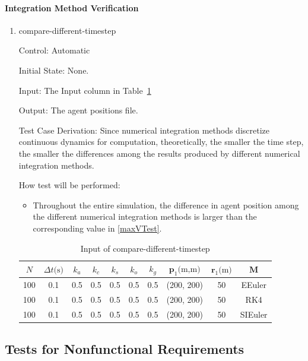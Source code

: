\documentclass[12pt, titlepage]{article}
\begin{document}
\paragraph{Integration Method Verification}

\begin{enumerate}

\item{compare-different-timestep\\} \label{timestepVTest}

Control: Automatic
					
Initial State: None.
					
Input: The Input column in Table~\ref{TblMethodTest1}
					
Output: The agent positions file.

Test Case Derivation: Since numerical integration methods discretize 
continuous dynamics for computation, theoretically, the smaller the time step, 
the smaller the differences among the results produced by different numerical 
integration methods.

How test will be performed: 
\begin{itemize}
\item Throughout the entire simulation, the difference in agent position among 
the different numerical integration methods is larger than the corresponding 
value in \ref{maxVTest}.
\end{itemize}

\begin{longtable}{c c c c c c c c c c}
\caption{Input of compare-different-timestep} \label{TblMethodTest1} \\
\hline
$N$ & ${\Delta t}\text{(s)}$ & $k_a$ & $k_c$ & $k_s$ & $k_o$ & $k_g$ & $\mathbf{p}_1\text{(m,m)}$ & $\mathbf{r}_1\text{(m)}$ & $\mathbf{M}$ \\
\hline
100 & 0.1 & 0.5 & 0.5 & 0.5 & 0.5 & 0.5 & (200, 200) & 50 & EEuler \\
100 & 0.1 & 0.5 & 0.5 & 0.5 & 0.5 & 0.5 & (200, 200) & 50 & RK4 \\
100 & 0.1 & 0.5 & 0.5 & 0.5 & 0.5 & 0.5 & (200, 200) & 50 & SIEuler \\
\hline
\end{longtable}
\end{enumerate}

\subsection{Tests for Nonfunctional Requirements} \label{test_nonfunc}
\end{document}

